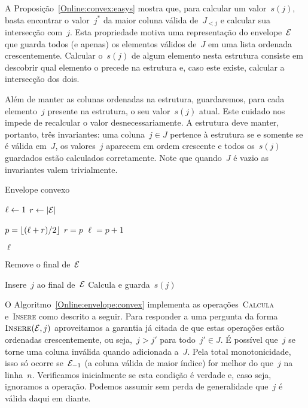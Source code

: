 A Proposição~\ref{Online:convex:easys} mostra que, para calcular um valor~$s(j)$, basta encontrar o valor~$j^*$ da maior coluna válida de~$J_{<j}$ e calcular sua intersecção com~$j$. Esta propriedade motiva uma representação do envelope~$\mathcal{E}$ que guarda todos (e apenas) os elementos válidos de~$J$ em uma lista ordenada crescentemente. Calcular o~$s(j)$ de algum elemento nesta estrutura consiste em descobrir qual elemento o precede na estrutura e, caso este existe, calcular a intersecção dos dois.

Além de manter as colunas ordenadas na estrutura, guardaremos, para cada elemento~$j$ presente na estrutura, o seu valor~$s(j)$ atual. Este cuidado nos impede de recalcular o valor desnecessariamente. A estrutura deve manter, portanto, três invariantes: uma coluna~$j \in J$ pertence à estrutura se e somente se é válida em~$J$, os valores~$j$ aparecem em ordem crescente e todos os~$s(j)$ guardados estão calculados corretamente. Note que quando~$J$ é vazio as invariantes valem trivialmente.

\begin{algorithm}[h]
\caption{Envelope convexo}
\label{Online:envelope:convex}
\begin{algorithmic}[1]
    \State $\ell \leftarrow 1$
    \State $r \leftarrow |\mathcal{E}|$
    
        \State $p = \lfloor (\ell+r)/2 \rfloor$
            \State $r = p$
        \Else
            \State $\ell = p+1$
        \EndIf
    \EndWhile

    \State \Return $\ell$
\EndFunction

        \State \Return
    \EndIf
    
        \State Remove o final de~$\mathcal{E}$
    \EndWhile

    \State Insere~$j$ ao final de~$\mathcal{E}$
    \State Calcula e guarda~$s(j)$
\EndFunction
\end{algorithmic}
\end{algorithm}

O Algoritmo~\ref{Online:envelope:convex} implementa as operações~\textsc{Calcula} e~\textsc{Insere} como descrito a seguir. Para responder a uma pergunta da forma~$\textsc{Insere}(\mathcal{E},j)$ aproveitamos a garantia já citada de que estas operações estão ordenadas crescentemente, ou seja,~$j > j'$ para todo~$j' \in J$. É possível que~$j$ se torne uma coluna inválida quando adicionada a~$J$. Pela total monotonicidade, isso só ocorre se~$\mathcal{E}_{-1}$ (a coluna válida de maior índice) for melhor do que~$j$ na linha~$n$. Verificamos inicialmente se esta condição é verdade e, caso seja, ignoramos a operação. Podemos assumir sem perda de generalidade que~$j$ é válida daqui em diante.

